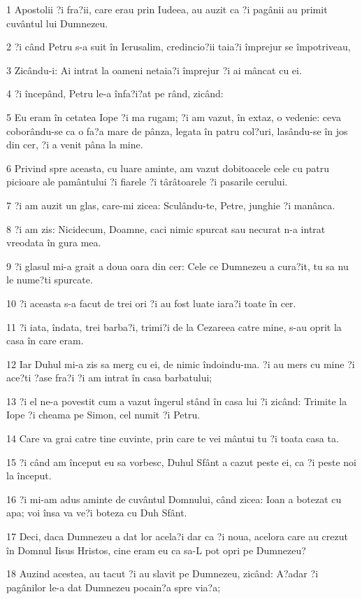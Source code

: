 \par 1 Apostolii ?i fra?ii, care erau prin Iudeea, au auzit ca ?i pagânii au primit cuvântul lui Dumnezeu.
\par 2 ?i când Petru s-a suit în Ierusalim, credincio?ii taia?i împrejur se împotriveau,
\par 3 Zicându-i: Ai intrat la oameni netaia?i împrejur ?i ai mâncat cu ei.
\par 4 ?i începând, Petru le-a înfa?i?at pe rând, zicând:
\par 5 Eu eram în cetatea Iope ?i ma rugam; ?i am vazut, în extaz, o vedenie: ceva coborându-se ca o fa?a mare de pânza, legata în patru col?uri, lasându-se în jos din cer, ?i a venit pâna la mine.
\par 6 Privind spre aceasta, cu luare aminte, am vazut dobitoacele cele cu patru picioare ale pamântului ?i fiarele ?i târâtoarele ?i pasarile cerului.
\par 7 ?i am auzit un glas, care-mi zicea: Sculându-te, Petre, junghie ?i manânca.
\par 8 ?i am zis: Nicidecum, Doamne, caci nimic spurcat sau necurat n-a intrat vreodata în gura mea.
\par 9 ?i glasul mi-a grait a doua oara din cer: Cele ce Dumnezeu a cura?it, tu sa nu le nume?ti spurcate.
\par 10 ?i aceasta s-a facut de trei ori ?i au fost luate iara?i toate în cer.
\par 11 ?i iata, îndata, trei barba?i, trimi?i de la Cezareea catre mine, s-au oprit la casa în care eram.
\par 12 Iar Duhul mi-a zis sa merg cu ei, de nimic îndoindu-ma. ?i au mers cu mine ?i ace?ti ?ase fra?i ?i am intrat în casa barbatului;
\par 13 ?i el ne-a povestit cum a vazut îngerul stând în casa lui ?i zicând: Trimite la Iope ?i cheama pe Simon, cel numit ?i Petru.
\par 14 Care va grai catre tine cuvinte, prin care te vei mântui tu ?i toata casa ta.
\par 15 ?i când am început eu sa vorbesc, Duhul Sfânt a cazut peste ei, ca ?i peste noi la început.
\par 16 ?i mi-am adus aminte de cuvântul Domnului, când zicea: Ioan a botezat cu apa; voi însa va ve?i boteza cu Duh Sfânt.
\par 17 Deci, daca Dumnezeu a dat lor acela?i dar ca ?i noua, acelora care au crezut în Domnul Iisus Hristos, cine eram eu ca sa-L pot opri pe Dumnezeu?
\par 18 Auzind acestea, au tacut ?i au slavit pe Dumnezeu, zicând: A?adar ?i pagânilor le-a dat Dumnezeu pocain?a spre via?a;
